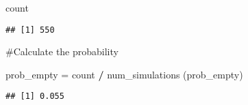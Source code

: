 \documentclass[
]{article}
\newenvironment{Shaded}{\begin{snugshade}}{\end{snugshade}}
\newcommand{\NormalTok}[1]{#1}
\newcommand{\OtherTok}[1]{\textcolor[rgb]{0.56,0.35,0.01}{#1}}
\newcommand{\SpecialCharTok}[1]{\textcolor[rgb]{0.81,0.36,0.00}{\textbf{#1}}}
\begin{document}
\begin{Shaded}
\begin{Highlighting}[]
\NormalTok{count}
\end{Highlighting}
\end{Shaded}

\begin{verbatim}
## [1] 550
\end{verbatim}

\#Calculate the probability

\begin{Shaded}
\begin{Highlighting}[]
\NormalTok{prob\_empty }\OtherTok{=}\NormalTok{ count }\SpecialCharTok{/}\NormalTok{ num\_simulations}
\NormalTok{(prob\_empty)}
\end{Highlighting}
\end{Shaded}

\begin{verbatim}
## [1] 0.055
\end{verbatim}
\end{document}
